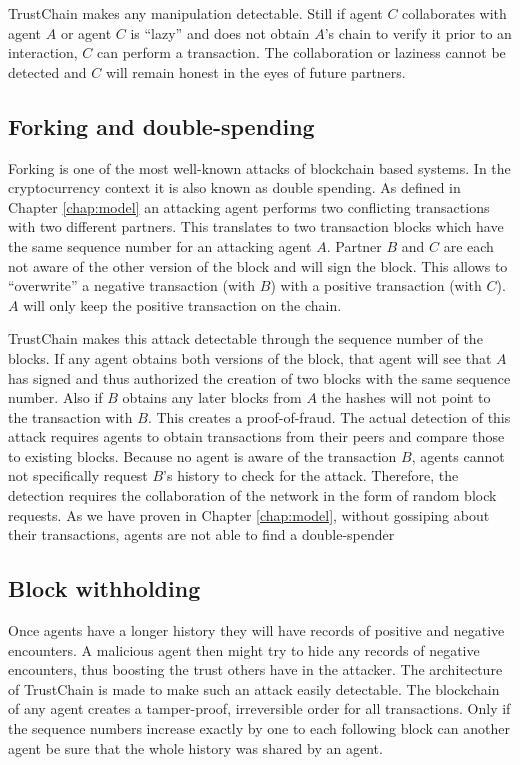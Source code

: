 TrustChain makes any manipulation detectable. Still if agent $C$ collaborates with agent $A$ or 
agent $C$ is ``lazy'' and does not obtain $A$'s chain to verify it prior to an interaction, $C$ can 
perform a transaction. The collaboration or laziness cannot be detected and $C$ will remain honest 
in the eyes of future partners.

\subsection{Forking and double-spending}
Forking is one of the most well-known attacks of blockchain based systems. In the cryptocurrency 
context it is also known as double spending. As defined in Chapter \ref{chap:model} an attacking agent 
performs two conflicting transactions with two different partners. This translates to two transaction
blocks which have the same sequence number for an attacking agent $A$. Partner $B$ and $C$ are each
not aware of the other version of the block and will sign the block. This allows to ``overwrite''
a negative transaction (with $B$) with a positive transaction (with $C$). $A$ will only keep the positive transaction on 
the chain. 

TrustChain makes this attack detectable through the sequence number of the blocks. If any agent 
obtains both versions of the block, that agent will see that $A$ has signed and thus authorized the
creation of two blocks with the same sequence number. Also if $B$ obtains any later blocks from $A$ the hashes will not point to the 
transaction with $B$.  This creates a proof-of-fraud. The actual
detection of this attack requires agents to obtain transactions from their peers and compare those 
to existing blocks. Because no agent is aware of the transaction $B$, agents cannot not specifically 
request $B$'s history to check for the attack. Therefore, the detection requires the collaboration
of the network in the form of random block requests. As we have proven in Chapter \ref{chap:model}, 
without gossiping about their transactions, agents are not able to find a double-spender

\subsection{Block withholding}
Once agents have a longer history they will have records of positive and negative encounters. A 
malicious agent then might try to hide any records of negative encounters, thus boosting the trust 
others have in the attacker. The architecture of TrustChain is made to make such an attack easily detectable.
The blockchain of any agent creates a tamper-proof, irreversible order for all transactions. Only if
the sequence numbers increase exactly by one to each following block can another agent be sure that 
the whole history was shared by an agent. 

